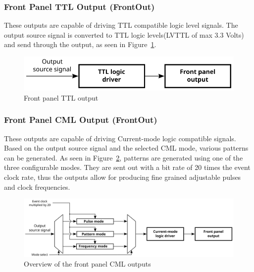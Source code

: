 \documentclass[12pt,a4paper]{article}
\begin{document}
\subsubsection{Front Panel TTL Output (FrontOut)}\label{sec:Front Panel TTL Output}
These outputs are capable of driving TTL compatible logic level signals. The output source signal is converted to TTL logic levels(LVTTL of max 3.3 Volts) and send through the output, as seen in Figure~\ref{fig:output_ttl}.

\begin{figure}[H]
	\centering
	\includegraphics[]{./img/TTL}
	\caption{Front panel TTL output}
	\label{fig:output_ttl}
\end{figure}

\subsubsection{Front Panel CML Output (FrontOut)}\label{sec:Front Panel CML Output}
These outputs are capable of driving Current-mode logic compatible signals. Based on the output source signal and the selected CML mode, various patterns can be generated. As seen in Figure~\ref{fig:output_cml}, patterns are generated using one of the three configurable modes. They are sent out with a bit rate of 20 times the event clock rate, thus the outputs allow for producing fine grained adjustable pulses and clock frequencies.
\begin{figure}[H]
	\centering
	\includegraphics[width=\columnwidth]{./img/CML}
	\caption{Overview of the front panel CML outputs}
	\label{fig:output_cml}
\end{figure}
\end{document}
